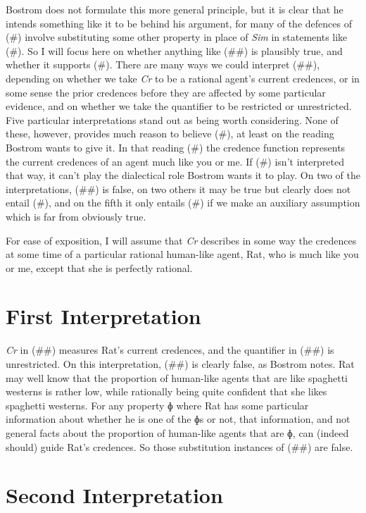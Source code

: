 \documentclass[
  10pt,
  letterpaper,
  DIV=11,
  numbers=noendperiod,
  twoside]{scrartcl}
\begin{document}
Bostrom does not formulate this more general principle, but it is clear
that he intends something like it to be behind his argument, for many of
the defences of (\#) involve substituting some other property in place
of \emph{Sim} in statements like (\#). So I will focus here on whether
anything like (\#\#) is plausibly true, and whether it supports (\#).
There are many ways we could interpret (\#\#), depending on whether we
take \emph{Cr} to be a rational agent's current credences, or in some
sense the prior credences before they are affected by some particular
evidence, and on whether we take the quantifier to be restricted or
unrestricted. Five particular interpretations stand out as being worth
considering. None of these, however, provides much reason to believe
(\#), at least on the reading Bostrom wants to give it. In that reading
(\#) the credence function represents the current credences of an agent
much like you or me. If (\#) isn't interpreted that way, it can't play
the dialectical role Bostrom wants it to play. On two of the
interpretations, (\#\#) is false, on two others it may be true but
clearly does not entail (\#), and on the fifth it only entails (\#) if
we make an auxiliary assumption which is far from obviously true.

For ease of exposition, I will assume that \emph{Cr} describes in some
way the credences at some time of a particular rational human-like
agent, Rat, who is much like you or me, except that she is perfectly
rational.

\section{First Interpretation}\label{first-interpretation}

\emph{Cr} in (\#\#) measures Rat's current credences, and the quantifier
in (\#\#) is unrestricted. On this interpretation, (\#\#) is clearly
false, as Bostrom notes. Rat may well know that the proportion of
human-like agents that are like spaghetti westerns is rather low, while
rationally being quite confident that she likes spaghetti westerns. For
any property ɸ where Rat has some particular information about whether
he is one of the ɸs or not, that information, and not general facts
about the proportion of human-like agents that are ɸ, can (indeed
should) guide Rat's credences. So those substitution instances of (\#\#)
are false.

\section{Second Interpretation}\label{second-interpretation}
\end{document}
